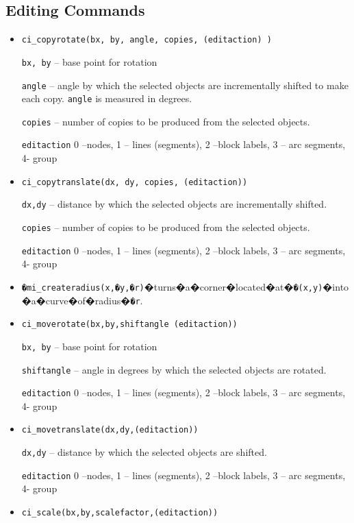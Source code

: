 \subsection{Editing Commands}
\begin{itemize}

\item \texttt{ci\_copyrotate(bx, by, angle, copies, (editaction) )}

\texttt{bx, by} -- base point for rotation

\texttt{angle} -- angle by which the selected objects are incrementally
shifted to make each copy. \texttt{angle} is measured in degrees.

\texttt{copies} -- number of copies to be produced from the selected
objects.

\texttt{editaction} 0 --nodes, 1 -- lines (segments), 2 --block labels, 3 --
arc segments, 4- group

\item \texttt{ci\_copytranslate(dx, dy, copies, (editaction))}

\texttt{dx,dy} -- distance by which the selected objects are incrementally
shifted.

\texttt{copies} -- number of copies to be produced from the selected
objects.

\texttt{editaction} 0 --nodes, 1 -- lines (segments), 2 --block labels, 3 --
arc segments, 4- group

\item{\tt�mi\_createradius(x,�y,�r)}�turns�a�corner�located�at�{\tt�(x,y)}�into�a�curve�of�radius�{\tt�r}.

\item \texttt{ci\_moverotate(bx,by,shiftangle (editaction))}

\texttt{bx, by} -- base point for rotation

\texttt{shiftangle} -- angle in degrees by which the selected objects are
rotated.

\texttt{editaction} 0 --nodes, 1 -- lines (segments), 2 --block labels, 3 --
arc segments, 4- group

\item \texttt{ci\_movetranslate(dx,dy,(editaction))}

\texttt{dx,dy} -- distance by which the selected objects are shifted.

\texttt{editaction} 0 --nodes, 1 -- lines (segments), 2 --block labels, 3 --
arc segments, 4- group

\item \texttt{ci\_scale(bx,by,scalefactor,(editaction))}


\end{itemize}

